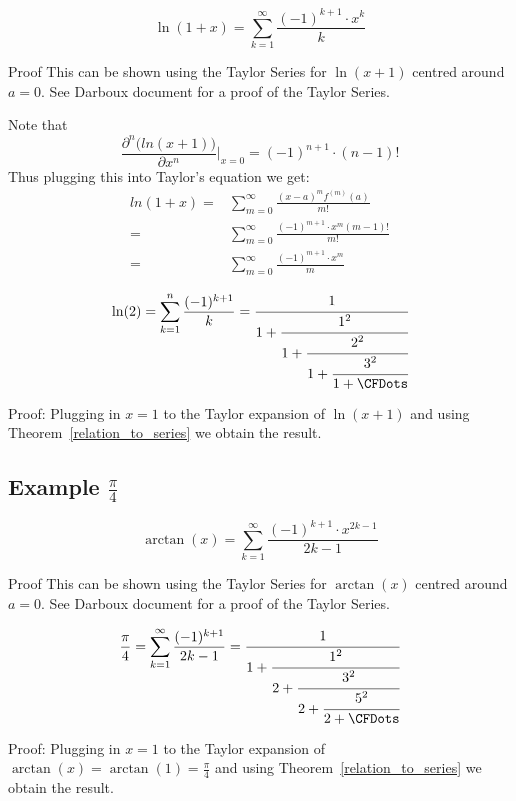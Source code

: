 \documentclass[a4paper]{article}
\begin{document}
    \begin{lemma}
        \[
        \ln(1+x) = \sum_{k=1}^{\infty} \frac{(-1)^{k+1} \cdot x^k}{k}
        \]

        Proof
        This can be shown using the Taylor Series for $\ln(x+1)$ centred around $a=0$.
        See Darboux document for a proof of the Taylor Series.

        Note that
        \begin{equation*}
            \frac{\partial^n \big(ln(x+1) \big)}{\partial x^n} \rvert_{x=0} = (-1)^{n+1} \cdot (n-1)!
        \end{equation*}
        Thus plugging this into Taylor's equation we get:
        \begin{align*}
            ln(1+x) =& \sum_{m=0}^{\infty} \frac{(x-a)^m f^{(m)}(a)}{m!}
            \\
            =& \sum_{m=0}^{\infty} \frac{(-1)^{m+1} \cdot x^m (m-1)!}{m!}
            \\
            =& \sum_{m=0}^{\infty} \frac{(-1)^{m+1} \cdot x^m}{m}
        \end{align*}
    \end{lemma}

    \begin{lemma}
        \[
        \ln(2) = \sum_{k=1}^{n} \frac{(-1)^{k+1}}{k} = \cfrac{1}{1+\cfrac{1^{2}}{1 +\cfrac{2^2}{1 + \cfrac{3^2}{1 + \CFDots}}}}
        \]

        Proof:
        Plugging in $x=1$ to the Taylor expansion of $\ln(x+1)$ and using Theorem~\ref{relation_to_series} we obtain the result.
    \end{lemma}

    \subsection{Example $\frac{\pi}{4}$}\label{subsec:example-$frac{pi}{4}$}
    \begin{lemma}
        \[
        \arctan(x) = \sum_{k=1}^{\infty} \frac{(-1)^{k+1} \cdot x^{2k-1}}{2k-1}
        \]

        Proof
        This can be shown using the Taylor Series for $\arctan(x)$ centred around $a=0$.
        See Darboux document for a proof of the Taylor Series.
    \end{lemma}

    \begin{lemma}
        \[
        \frac{\pi}{4} = \sum_{k=1}^{\infty} \frac{(-1)^{k+1}}{2k-1} = \cfrac{1}{1+\cfrac{1^2}{2 +\cfrac{3^2}{2 + \cfrac{5^2}{2 + \CFDots}}}}
        \]

        Proof:
        Plugging in $x=1$ to the Taylor expansion of $\arctan(x)=\arctan(1)=\frac{\pi}{4}$ and using Theorem~\ref{relation_to_series} we obtain the result.
    \end{lemma}
\end{document}
